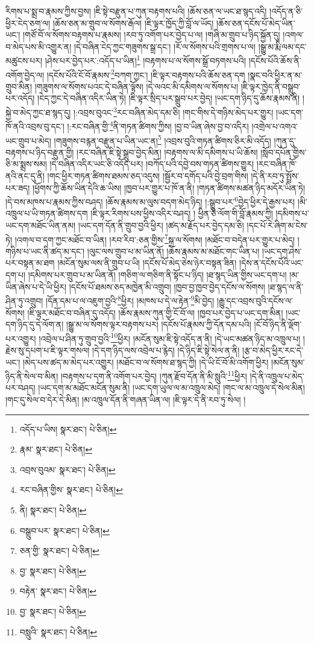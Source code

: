 རིགས་པ་སྨྲ་བ་རྣམས་ཀྱིས་བྱས། །ཇི་སྟེ་བརྫུན་པ་ཀུན་བརྟགས་པའི། །ཆོས་ཅན་ལ་ཡང་ཐ་སྙད་འདི། །འདོད་ན་ཅི་ཕྱིར་ངེད་ཅག་ལ། །ཆོས་ཅན་མ་གྲུབ་ལ་སོགས་རྒོལ། །ཇི་ལྟར་ཁྱོད་ཀྱི་བློ་ལ་ཡོད། །ཆོས་ཅན་དངོས་པོ་མེད་ཡིན་ཡང་། །གཙོ་བོ་ལ་སོགས་བརྟགས་པ་རྣམས། །རབ་ཏུ་འགོག་པར་བྱེད་པ་ལ། །གཞི་མ་གྲུབ་པ་ཉིད་སྐྱོན་དུ། །འགལ་བ་མེད་པས་མི་འགྱུར་ན། །དེ་བཞིན་ངེད་ཀྱང་གཟུགས་སྒྲ་དང་། །རོ་ལ་སོགས་པའི་གྲགས་པ་ལ། །སྒྱུ་མ་རྨི་ལམ་དང་མཚུངས་པར། །ཤེས་པར་བྱེད་པར་:འདོད་པ་ཡིན།\footnote{འདོད་པ་ཡིས།  སྣར་ཐང་།  པེ་ཅིན། } །བརྟགས་པ་ལ་སོགས་སྒྲོ་བཏགས་པའི། །དངོས་པོའི་ཆོས་ནི་འགོག་བྱེད་ལ། །དངོས་པོའི་ངོ་བོ་རྣམས་\footnote{རྣམ་  སྣར་ཐང་།  པེ་ཅིན། }བཀག་ཀྱང་། །ཇི་ལྟར་བརྟགས་པའི་ཆོས་ཅན་དག །སྣང་བའི་ཕྱིར་ན་མ་གྲུབ་མིན། །གཟུགས་ལ་སོགས་པའང་དེ་བཞིན་ལྟོས། །དེ་ལའང་མི་དམིགས་ལ་སོགས་པ། །ཇི་ལྟར་ཁྱེད་ནི་བསྒྲུབ་པར་འདོད། །ངེད་ཀྱང་དེ་བཞིན་འདིར་ཡིན་ཏེ། །ཇི་ལྟར་སྲིད་པར་སྒྲུབ་པར་བྱེད། །ཡང་དག་ཉིད་དུ་ཆོས་རྣམས་ནི། །སྐྱེ་བ་མེད་ཀྱང་ཐ་སྙད་དུ། །:འབྲས་བུའང་\footnote{འབྲས་བུའམ་  སྣར་ཐང་།  པེ་ཅིན། }རང་བཞིན་མེད་དམ་ཅི། །གང་གིས་དེ་གཉིས་མེད་པར་གྱུར། །ཡང་དག་ཁོ་ནའི་འབྲས་བུ་དང་། །:རང་བཞིན་གྱི་\footnote{རང་བཞིན་གྱིས་  སྣར་ཐང་།  པེ་ཅིན། }ནི་གཏན་ཚིགས་ཀྱིས། །བྱ་བ་ཡིན་ཞེས་བྱ་བ་འདིར། །འགྲེལ་པ་འགའ་ཡང་གྲུབ་པ་མེད། །གཟུགས་བརྙན་བརྫུན་པ་ཡིན་ཡང་ན།\footnote{ནི།  སྣར་ཐང་།  པེ་ཅིན། } །འབྲས་བུའི་གཏན་ཚིགས་ཅིར་མི་འདོད། །ཀུན་དུ་བརྟགས་པ་ཉིད་བརྫུན་གྱི། །རང་བཞིན་ཇི་སྟེ་སྒྲུབ་བྱེད་མིན། །བརྟགས་ལ་མི་དམིགས་པ་ཡི་ཆོས། །སློབ་དཔོན་གྱིས་ཅི་མ་སྨྲས་སམ། །དེ་བཞིན་འདིར་ཡང་ཅི་འདོད་པར། །བཀོད་པའི་དབྱེ་བས་གཏན་ཚིགས་གྱུར། །རང་བཞིན་ཁོ་ནའི་ནང་དུ་ནི། །གང་ཕྱིར་གཏན་ཚིགས་ཐམས་ཅད་འདུས། །སྦྱོར་བ་དགོད་པའི་བྱེ་བྲག་གིས། །དེ་ནི་རབ་ཏུ་སྤྲོས་པར་ཟད། །ཕྱོགས་ཀྱི་ཆོས་ཡིན་དེའི་ཆ་ཡིས། །ཁྱབ་པར་གྱུར་པ་ཁོ་ན་ནི། །གཏན་ཚིགས་མཚན་ཉིད་མདོར་ཡིན་ཏེ། །དེ་བས་མཁས་པ་རྣམས་ཀྱིས་བཤད། །ཆོས་རྣམས་མ་ལུས་བདག་མེད་ཉིད། །:སྒྲུབ་པར་\footnote{བསྒྲུབ་པར་  སྣར་ཐང་།  པེ་ཅིན། }བྱེད་ཕྱིར་དེ་རྒྱས་པར། །མི་འཁྲུལ་པ་ཡི་གཏན་ཚིགས་དག །ཇི་ལྟར་རིགས་པས་ཕྱིས་འདིར་བཤད། །
ཕྱིན་ཅི་ལོག་གི་བློ་རྣམས་ཀྱི། །དམིགས་པ་ཡང་དག་མཐོང་ཡིན་ནམ། །ཡང་དག་དོན་ནི་གྲུབ་བྱའི་ཕྱིར། །ཚད་མ་རྗོད་པར་བྱེད་དམ་ཅི། །དང་པོ་རེ་ཞིག་མ་ངེས་ཏེ། །འགལ་བ་དག་ཀྱང་མཐོང་བ་ཡིན། །རབ་རིབ་:ཅན་གྱིས་\footnote{ཅན་གྱི་  སྣར་ཐང་།  པེ་ཅིན། }སྐྲ་ལ་སོགས། །མཐོང་བ་བདེན་པར་གྱུར་པ་མེད། །གཉིས་པ་ཡང་ནི་ཚད་མ་དང་། །ལུང་ལས་གྲུབ་པ་མ་ཡིན་ནོ། །ཆོས་རྣམས་མ་མཐོང་གང་ཡིན་པ། །ཡང་དག་ཤེས་པར་བསྟན་མ་ཐག །མངོན་སུམ་ལས་ནི་གྲུབ་པ་ཡི། །དངོས་པོ་མེད་ཅེས་ཉེར་བསྟན་ཟིན། །དེས་ན་དངོས་པོའི་ཡང་དག་པ། །དམིགས་པར་གྲུབ་པ་མ་ཡིན་ནོ། །གཅིག་ལ་གཅིག་ནི་སྟོང་པ་ཉིད། །ཐ་སྙད་ཡིན་གྱིས་ཡང་དག་པ། །མ་ཡིན་ཞེས་པ་དེ་ཡི་ཕྱིར། །དངོས་པོ་ཐམས་ཅད་མཁྱེན་མི་འགྲུབ། །ཁྱབ་བྱ་ཁྱབ་བྱེད་དངོས་ལ་སོགས། །ཐ་སྙད་ལ་ནི་ཤིན་ཏུ་འགྲུབ། །དོན་དམ་པ་ལ་འཇུག་བྱའི་\footnote{བྱ་  སྣར་ཐང་།  པེ་ཅིན། }ཕྱིར། །མཁས་པ་དེ་ལ་རྟེན་\footnote{བརྟེན་  སྣར་ཐང་།  པེ་ཅིན། }མི་བྱེད། །རྒྱུ་དང་འབྲས་བུའི་དངོས་ལ་སོགས། །ཇི་ལྟར་མཐོང་བ་བཞིན་དུ་འདོད། །ཆོས་རྣམས་ཀུན་གྱི་ངོ་བོ་ལ། །ཁྱབ་པར་བྱེད་པ་ཡང་དག་མིན། །ཡང་དག་ཉིད་དུ་དེ་ལོག་ན། །སྒྱུ་མ་ལ་སོགས་ལྟར་བརྟགས་པར། །དངོས་པོ་རྣམས་ཀྱི་དོན་དམ་པའི། །ངོ་བོ་ཉིད་ནི་ལྡོག་པར་འགྱུར། །འབྲེལ་པ་ཤིན་ཏུ་གྲུབ་བྱའི་\footnote{བྱ་  སྣར་ཐང་།  པེ་ཅིན། }ཕྱིར། །མངོན་སུམ་ཇི་སྟེ་འདོད་ན་ནི། །དེ་ཡང་མཚན་ཉིད་མ་འཁྲུལ་པ། །རྗེས་སུ་དཔག་པ་ཇི་ལྟར་གསལ། །དེ་དག་ཉིད་ལས་འབྲེལ་པ་རྙེད། །དེ་ཉིད་ཇི་སྟེ་སེལ་ན་ནི། །རྩ་བ་མེད་ཕྱིར་རང་དེ་ཡང་། །མེད་པས་ཚད་མ་མེད་པར་འགྱུར། །མཐོང་བ་ལ་སོགས་ཐ་སྙད་ཀྱི། །དེ་ཡི་ངོ་བོ་མི་འགོག་ཕྱིར། །མངོན་སུམ་ཉིད་ནི་སེལ་བ་མིན། །བརྟགས་པ་དག་ནི་འགོག་པར་བྱེད། །ཀུན་རྫོབ་དོན་ནི་མི་སླུའི་\footnote{བསླུའི་  སྣར་ཐང་།  པེ་ཅིན། }ཕྱིར། །དེ་ནི་འཁྲུལ་པ་མེད་པར་བཤད། །ཡང་དག་མ་མཐོང་མངོན་སུམ་ནི། །ཡང་དག་ཡུལ་ལ་མ་འཁྲུལ་མེད། །གང་ལ་མ་འཁྲུལ་དེ་སེལ་མིན། །གང་དུ་སེལ་བ་དེར་དེ་མིན། །མ་འཁྲུལ་དོན་ནི་གཞན་ཡིན་ལ། །ཇི་ལྟར་དེ་ནི་རབ་ཏུ་སེལ། །
